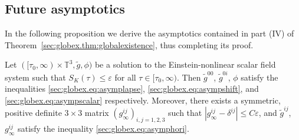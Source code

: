 \documentclass{article}
\newcommand{\TT}{\mathbb{T}}
\newcommand{\wt}{\widetilde}
\newcommand{\ve}{\varepsilon}
\begin{document}
\subsection{Future asymptotics}
In the following proposition we derive the asymptotics contained in part (IV) of Theorem~\ref{sec:globex.thm:globalexistence}, thus completing its proof.
\begin{proposition}\label{sec:completethm.prop:asymp}
    Let $([\tau_0,\infty)\times\TT^3,\wt{g},\phi)$ be a solution to the Einstein-nonlinear scalar field system such that $S_K(\tau) \leq \ve$ for all $\tau \in [\tau_0,\infty)$. Then $\wt{g}^{00}$, $\wt{g}^{0i}$, $\phi$ satisfy the inequalities \eqref{sec:globex.eq:asymplapse}, \eqref{sec:globex.eq:asympshift}, and \eqref{sec:globex.eq:asympscalar} respectively. Moreover, there exists a symmetric, positive definite $3\times3$ matrix $(g_\infty^{ij})_{i,j=1,2,3}$ such that $|g_{\infty}^{ij} - \delta^{ij}| \leq C\ve$, and $\wt{g}^{ij}$, $g_\infty^{ij}$ satisfy the inequality \eqref{sec:globex.eq:asymphori}. 
\end{proposition}
\end{document}
